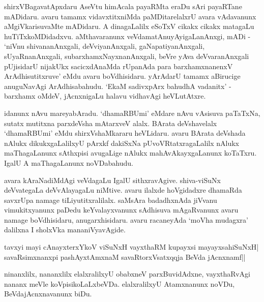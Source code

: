 shirxVBagavatApxdaru AseVtu himAcala payaRMta eraDu sAri payaRTane mADidaru. avaru tamamx vidavxtitxniMda paMDitarelalxrU avara vAdavanunx aMgiVkarisuvaMte mADidaru. A dinagaLalilx eSoTxV cikakx cikakx matagaLu huTiTxkoMDidadxvu. aMthavaranunx veVdamatAnuyAyigaLanAnxgi, mADi - `niVnu shivananAnxgali, deVviyanAnxgali, gaNapatiyanAnxgali, sUyaRnanAnxgali, subarxhamxNayxnanAnxgali, beVre yAva deVvaranAnxgali pUjisidarU nijakUkx sacicxdAnaMda rUpanAda para barxhamxnanenxV ArAdhisutitxruve' eMdu avaru boVdhisidaru. yArAdarU tamamx aBirucige anuguNavAgi ArAdhisabahudu. `EkaM sadivxpArx bahudhA vadanitx' - barxhamx oMdeV, jAcnxnigaLu halavu vidhavAgi heVLutAtxre.

idanunx nAvu mareyabAradu. `dhamaRBUmi' eMdare nAvu vAsisuva paTaTx‌Na, sutatx mutitxna parxdeVsha mAtarxveV alalx. BArata deVshavelalx `dhamaRBUmi' eMdu shirxVshaMkararu heVLidaru. avaru BArata deVshada nAlukx dikukxgaLalilxyU pArxkf dakiSxNa pUvoVRtatxragaLalilx nAlukx maThagaLanunx sAthxpisi avugaLige nAlukx mahAvAkayxgaLanunx koTaTxru. IgalU A maThagaLanunx noVDabahudu.

avara kAraNadiMdAgi veVdagaLu IgalU sithxravAgive. shiva-viSuNx deVvategaLa deVvAlayagaLu niMtive. avaru ilalxde hoVgidadxre dhamaRda savxrUpa namage tiLiyutitxralilalx. saMsAra badadhxnAda jiVvanu vimukitxyanunx paDedu keYvalayxvanunx sAdhisuva mAgaRvanunx avaru namage boVdhisidaru, anugarxhisidaru. avaru racaneyAda `moVha mudagxra' dalilxna I sholxVka mananiVyavAgide.

\begin{shloka}
tavxyi mayi cAnayxterxYkoV viSuNxH vayxthaRM kupayxsi mayayxsahiSuNxH|\\
savaRsimxnanxpi pashAyxtAmxnaM savaRtorxVsatxqqja BeVda jAcnxnamf||
\end{shloka}

ninanxlilx, nananxlilx elalxralilxyU obabxneV parxBuvidAdxne, vayxthaRvAgi nananx meVle koVpisikoLaLxbeVDa. elalxralilxyU Atamxnanunx noVDu, BeVdajAcnxnavanunx biDu.

